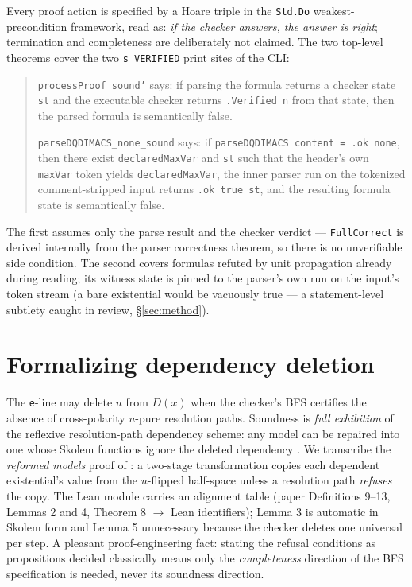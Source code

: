 \documentclass{article}
\begin{document}
Every proof action is specified by a Hoare triple in the
\texttt{Std.Do} weakest-precondition framework, read as: \emph{if the
checker answers, the answer is right}; termination and completeness are
deliberately not claimed. The two top-level theorems cover the two
\texttt{s VERIFIED} print sites of the CLI:
\begin{quote}\small
\noindent\texttt{processProof\_sound'} says: if parsing the formula returns a
checker state \texttt{st} and the executable checker returns
\texttt{.Verified n} from that state, then the parsed formula is
semantically false.

\medskip
\noindent\texttt{parseDQDIMACS\_none\_sound} says: if
\texttt{parseDQDIMACS content = .ok none}, then there exist
\texttt{declaredMaxVar} and \texttt{st} such that the header's own
\texttt{maxVar} token yields \texttt{declaredMaxVar}, the inner parser run on
the tokenized comment-stripped input returns \texttt{.ok true st}, and the
resulting formula state is semantically false.
\end{quote}
The first assumes only the parse result and the checker verdict ---
\texttt{FullCorrect} is derived internally from the parser correctness
theorem, so there is no unverifiable side condition. The second covers
formulas refuted by unit propagation already during reading; its witness
state is pinned to the parser's own run on the input's token stream (a bare
existential would be vacuously true --- a statement-level subtlety caught in
review, \S\ref{sec:method}).

\section{Formalizing dependency deletion}\label{sec:deletion}
The \texttt{e}-line may delete $u$ from $D(x)$ when the checker's BFS
certifies the absence of cross-polarity $u$-pure resolution paths. Soundness
is \emph{full exhibition} of the reflexive resolution-path dependency
scheme: any model can be repaired into one whose Skolem functions ignore the
deleted dependency \cite{WimmerWimmerSchollBecker2016,
BeyersdorffBlinkhornChewSchmidtSuda2019,BeyersdorffBlinkhornPeitl2020}. We
transcribe the \emph{reformed models} proof of
\cite{BeyersdorffBlinkhornChewSchmidtSuda2019}: a two-stage transformation
copies each dependent existential's value from the $u$-flipped half-space
unless a resolution path \emph{refuses} the copy. The Lean module carries an
alignment table (paper Definitions 9--13, Lemmas 2 and 4, Theorem 8 $\to$
Lean identifiers); Lemma 3 is automatic in Skolem form and Lemma 5
unnecessary because the checker deletes one universal per step. A pleasant
proof-engineering fact: stating the refusal conditions as propositions
decided classically means only the \emph{completeness} direction of the BFS
specification is needed, never its soundness direction.
\end{document}
